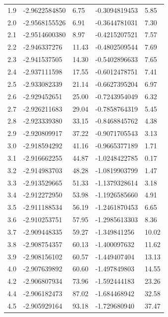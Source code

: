 \documentclass{pracalicmgr}
\begin{document}
\begin{longtable}[c]{lllll}
    1.9 & -2.9622584850  & 6.75   & -0.3094819453  & 5.85    \\
    2.0 & -2.9568155526  & 6.91   & -0.3644781031  & 7.30    \\
    2.1 & -2.9514600380  & 8.97   & -0.4215207521  & 7.57    \\
    2.2 & -2.946337276   & 11.43  & -0.4802509544  & 7.69    \\
    2.3 & -2.941537505   & 14.30  & -0.5402896633  & 7.65    \\
    2.4 & -2.937111598   & 17.55  & -0.6012478751  & 7.41    \\
    2.5 & -2.933082339   & 21.14  & -0.6627395204  & 6.97    \\
    2.6 & -2.929452651   & 25.00  & -0.7243954049  & 6.32    \\
    2.7 & -2.926211683   & 29.04  & -0.7858764319  & 5.45    \\
    2.8 & -2.923339380   & 33.15  & -0.8468845762  & 4.38    \\
    2.9 & -2.920809917   & 37.22  & -0.9071705543  & 3.13    \\
    3.0 & -2.918594292   & 41.16  & -0.9665377189  & 1.71    \\
    3.1 & -2.916662255   & 44.87  & -1.0248422785  & 0.17    \\
    3.2 & -2.914983703   & 48.28  & -1.0819903799  & 1.47    \\
    3.3 & -2.913529665   & 51.33  & -1.1379328614  & 3.18    \\
    3.4 & -2.912272950   & 53.98  & -1.1926585660  & 4.91    \\
    3.5 & -2.911188534   & 56.19  & -1.2461870453  & 6.65    \\
    3.6 & -2.910253751   & 57.95  & -1.2985613303  & 8.36    \\
    3.7 & -2.909448335   & 59.27  & -1.349841256   & 10.02   \\
    3.8 & -2.908754357   & 60.13  & -1.400097632   & 11.62   \\
    3.9 & -2.908156102   & 60.57  & -1.449407404   & 13.13   \\
    4.0 & -2.907639892   & 60.60  & -1.497849803   & 14.55   \\
    4.2 & -2.906807934   & 73.96  & -1.592444183   & 23.26   \\
    4.4 & -2.906182473   & 87.02  & -1.684468942   & 32.58   \\
    4.5 & -2.905929164   & 93.18  & -1.729680940   & 37.47   \\

\end{longtable}
\end{document}
